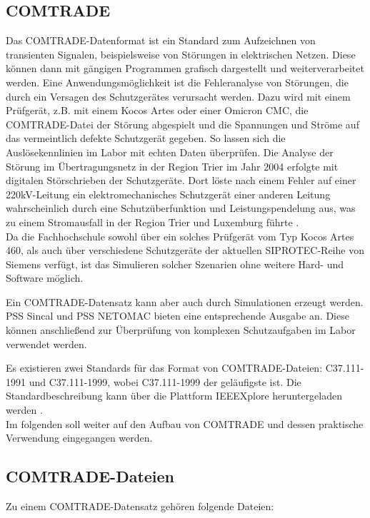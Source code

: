 \documentclass{scrartcl}
\begin{document}
\begin{onehalfspace}
\section{COMTRADE}
Das COMTRADE-Datenformat ist ein Standard zum Aufzeichnen von transienten Signalen, beispielsweise von Störungen in elektrischen Netzen. Diese können dann mit gängigen Programmen grafisch dargestellt und weiterverarbeitet werden. Eine Anwendungsmöglichkeit ist die Fehleranalyse von Störungen, die durch ein Versagen des Schutzgerätes verursacht werden. Dazu wird mit einem Prüfgerät, z.B. mit einem Kocos Artes oder einer Omicron CMC, die COMTRADE-Datei der Störung \glqq abgespielt\grqq{} und die Spannungen und Ströme auf das vermeintlich defekte Schutzgerät gegeben. So lassen sich die Auslösekennlinien im Labor mit echten Daten überprüfen. Die Analyse der Störung im Übertragungsnetz in der Region Trier im Jahr 2004 erfolgte mit digitalen Störschrieben der Schutzgeräte. Dort löste nach einem Fehler auf einer 220kV-Leitung ein elektromechanisches Schutzgerät einer anderen Leitung wahrscheinlich durch eine Schutzüberfunktion und Leistungspendelung aus, was zu einem Stromausfall in der Region Trier und Luxemburg führte \cite{abschlussbericht-trier}. \\ Da die Fachhochschule sowohl über ein solches Prüfgerät vom Typ Kocos Artes 460, als auch über verschiedene Schutzgeräte der aktuellen SIPROTEC-Reihe von Siemens verfügt, ist das Simulieren solcher Szenarien ohne weitere Hard- und Software möglich.

Ein COMTRADE-Datensatz kann aber auch durch Simulationen erzeugt werden. PSS Sincal und PSS NETOMAC bieten eine entsprechende Ausgabe an. Diese können anschließend zur Überprüfung von komplexen Schutzaufgaben im Labor verwendet werden.

Es existieren zwei Standards für das Format von COMTRADE-Dateien: C37.111-1991 und C37.111-1999, wobei C37.111-1999 der geläufigste ist. Die Standardbeschreibung kann über die Plattform IEEEXplore heruntergeladen werden \cite{ieee-comtrade}. \\
Im folgenden soll weiter auf den Aufbau von COMTRADE und dessen praktische Verwendung eingegangen werden.

\subsection{COMTRADE-Dateien}
Zu einem COMTRADE-Datensatz gehören folgende Dateien:


\end{onehalfspace}
\end{document}
